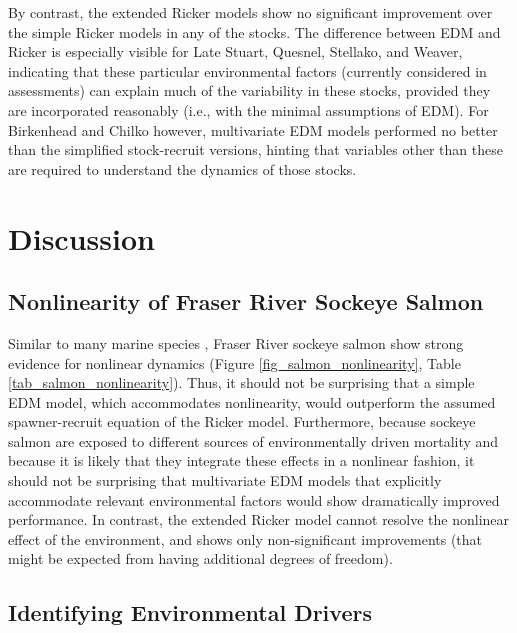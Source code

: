 By contrast, the extended Ricker models show no significant improvement over the simple Ricker models in any of the stocks. The difference between EDM and Ricker is especially visible for Late Stuart, Quesnel, Stellako, and Weaver, indicating that these particular environmental factors (currently considered in assessments) can explain much of the variability in these stocks, provided they are incorporated reasonably (i.e., with the minimal assumptions of EDM). For Birkenhead and Chilko however, multivariate EDM models performed no better than the simplified stock-recruit versions, hinting that variables other than these are required to understand the dynamics of those stocks.

\section{Discussion}

\subsection{Nonlinearity of Fraser River Sockeye Salmon}

Similar to many marine species \cite{Hsieh_2005, Glaser_2014a}, Fraser River sockeye salmon show strong evidence for nonlinear dynamics (Figure \ref{fig_salmon_nonlinearity}, Table \ref{tab_salmon_nonlinearity}). Thus, it should not be surprising that a simple EDM model, which accommodates nonlinearity, would outperform the assumed spawner-recruit equation of the Ricker model. Furthermore, because sockeye salmon are exposed to different sources of environmentally driven mortality and because it is likely that they integrate these effects in a nonlinear fashion, it should not be surprising that multivariate EDM models that explicitly accommodate relevant environmental factors would show dramatically improved performance. In contrast, the extended Ricker model cannot resolve the nonlinear effect of the environment, and shows only non-significant improvements (that might be expected from having additional degrees of freedom).

\subsection{Identifying Environmental Drivers}

